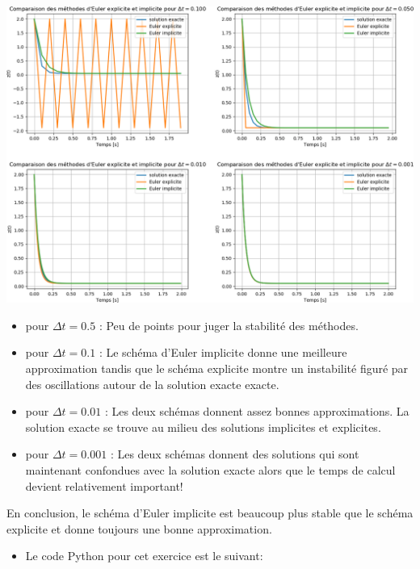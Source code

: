 \documentclass[%
oneside,                 %
final,                   %
10pt,french]{article}
\newenvironment{doconceexercise}{}{}
\begin{document}
\begin{doconceexercise}
\vspace{6mm}

\centerline{\includegraphics[width=1.0\linewidth]{scripts/illustrationEx2.png}}

\vspace{6mm}



\begin{itemize}
\item pour $\Delta t = 0.5$ : Peu de points pour juger la stabilité des méthodes.

\item pour $\Delta t = 0.1$ : Le schéma d'Euler implicite donne une meilleure approximation tandis que le schéma explicite montre un instabilité figuré par des oscillations autour de la solution exacte exacte.

\item pour $\Delta t = 0.01$ : Les deux schémas donnent assez bonnes approximations. La solution exacte se trouve au milieu des solutions implicites et explicites.

\item pour $\Delta t = 0.001$ : Les deux schémas donnent des solutions qui sont maintenant confondues avec la solution exacte alors que le temps de calcul devient relativement important!
\end{itemize}

\noindent
En conclusion, le schéma d'Euler implicite est beaucoup plus stable que le schéma explicite et donne toujours une bonne approximation.

\begin{itemize}
\item Le code Python pour cet exercice est le suivant:
\end{itemize}


\end{doconceexercise}
\end{document}
